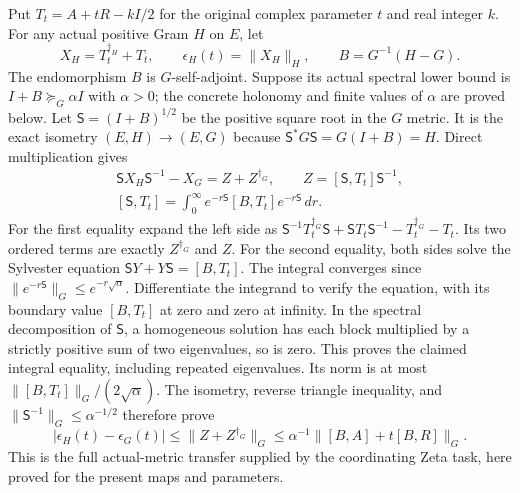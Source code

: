 \documentclass{article}
\begin{document}
Put $T_t=A+tR-kI/2$ for the original complex parameter $t$ and real
integer $k$. For any actual positive Gram $H$ on $E$, let
\[
 X_H=T_t^{\dagger_H}+T_t,
 \qquad \epsilon_H(t)=\|X_H\|_H,
 \qquad B=G^{-1}(H-G).
 \tag{HG8}
\]
The endomorphism $B$ is $G$-self-adjoint. Suppose its actual spectral
lower bound is $I+B\succeq_G\alpha I$ with $\alpha>0$; the concrete
holonomy and finite values of $\alpha$ are proved below. Let
$\mathsf S=(I+B)^{1/2}$ be the positive square root in the $G$ metric.
It is the exact isometry $(E,H)\to(E,G)$ because
$\mathsf S^*G\mathsf S=G(I+B)=H$. Direct multiplication gives
\[
\begin{gathered}
 \mathsf S X_H\mathsf S^{-1}-X_G=Z+Z^{\dagger_G},
 \qquad Z=[\mathsf S,T_t]\mathsf S^{-1},\\
 [\mathsf S,T_t]=\int_0^\infty
   e^{-r\mathsf S}[B,T_t]e^{-r\mathsf S}\,dr .
\end{gathered}\tag{HG9}
\]
For the first equality expand the left side as
$\mathsf S^{-1}T_t^{\dagger_G}\mathsf S+
\mathsf ST_t\mathsf S^{-1}-T_t^{\dagger_G}-T_t$.
Its two ordered terms are exactly $Z^{\dagger_G}$ and $Z$.
For the second equality, both sides solve the Sylvester equation
$\mathsf S Y+Y\mathsf S=[B,T_t]$.
The integral converges since
$\|e^{-r\mathsf S}\|_G\le e^{-r\sqrt\alpha}$.
Differentiate the integrand to verify the equation, with its boundary
value $[B,T_t]$ at zero and zero at infinity. In the spectral
decomposition of $\mathsf S$, a homogeneous solution has each block
multiplied by a strictly positive sum of two eigenvalues, so is zero.
This proves the claimed integral equality, including repeated eigenvalues.
Its norm is at most $\|[B,T_t]\|_G/(2\sqrt\alpha)$.
The isometry, reverse triangle inequality, and
$\|\mathsf S^{-1}\|_G\le\alpha^{-1/2}$ therefore prove
\[
 |\epsilon_H(t)-\epsilon_G(t)|
 \le\|Z+Z^{\dagger_G}\|_G
 \le\alpha^{-1}\|[B,A]+t[B,R]\|_G .
 \tag{HG10}
\]
This is the full actual-metric transfer supplied by the coordinating
Zeta task, here proved for the present maps and parameters.
\end{document}
